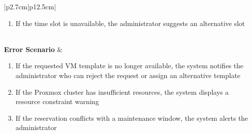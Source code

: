 \begin{table}[H]
\begin{tabular}{|p{2.7cm}|p{12.5cm}|}
\begin{minipage}[t]{\linewidth}
\begin{enumerate}[topsep=0pt,itemsep=1pt,parsep=0pt,partopsep=0pt]
                                          \item If the time slot is unavailable, the administrator suggests an alternative slot
                                      \end{enumerate}
                                  \end{minipage}                                                     \\ \hline
        \textbf{Error Scenario} & \begin{minipage}[t]{\linewidth}
                                      \begin{enumerate}[topsep=0pt,itemsep=1pt,parsep=0pt,partopsep=0pt]
                                          \item If the requested VM template is no longer available, the system notifies the
                                                administrator who can reject the request or assign an alternative template
                                          \item If the Proxmox cluster has insufficient resources, the system displays a
                                                resource constraint warning
                                          \item If the reservation conflicts with a maintenance window, the system alerts the
                                                administrator
                                      \end{enumerate}
                                  \end{minipage}                                                       \\ \hline
    \end{tabular}
    \label{tab:admin-vm-reservations}
\end{table}
